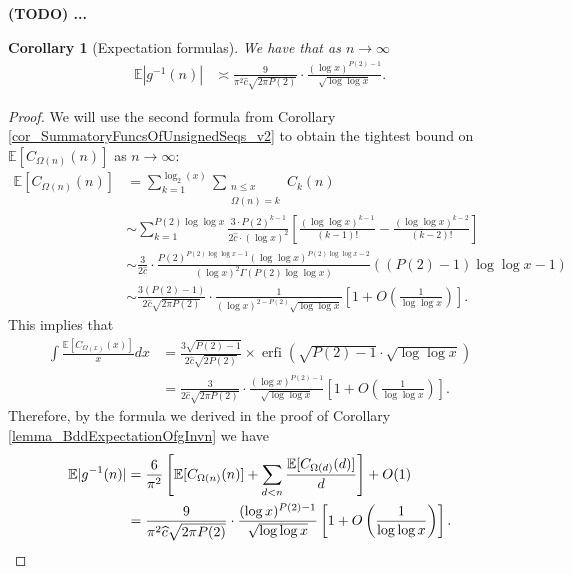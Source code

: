 \documentclass[11pt,reqno,a4letter]{article}
\numberwithin{figure}{section}
\numberwithin{table}{section}
\theoremstyle{plain}
\newtheorem{cor}[theorem]{Corollary}
\numberwithin{theorem}{section}
\theoremstyle{definition}
\begin{document}
\textbf{(TODO) ... } 

\begin{cor}[Expectation formulas] 
We have that as $n \rightarrow \infty$ 
\begin{align*} 
\mathbb{E}|g^{-1}(n)| & \asymp \frac{9}{\pi^2 \widehat{c} \sqrt{2\pi P(2)}} \cdot 
     \frac{(\log x)^{P(2)-1}}{\sqrt{\log\log x}}. 
\end{align*} 
\end{cor} 
\begin{proof} 
We will use the second formula from Corollary \ref{cor_SummatoryFuncsOfUnsignedSeqs_v2} 
to obtain the tightest bound on $\mathbb{E}[C_{\Omega(n)}(n)]$ as $n \rightarrow \infty$: 
\begin{align*} 
\mathbb{E}[C_{\Omega(n)}(n)] & = 
     \sum_{k=1}^{\log_2(x)} \sum_{\substack{n \leq x \\ \Omega(n) = k}} C_k(n) \\ 
     & \sim \sum_{k=1}^{P(2) \log\log x} \frac{3 \cdot P(2)^{k-1}}{ 
     2\widehat{c} \cdot (\log x)^2} \left[\frac{(\log\log x)^{k-1}}{(k-1)!} - 
     \frac{(\log\log x)^{k-2}}{(k-2)!}\right] \\ 
     & \sim \frac{3}{2\widehat{c}} \cdot 
     \frac{P(2)^{P(2)\log\log x-1} (\log\log x)^{P(2)\log\log x-2}}{ 
     (\log x)^2 \Gamma(P(2) \log\log x)} \left((P(2)-1) \log\log x - 1\right) \\ 
     & \sim \frac{3 (P(2)-1)}{2\widehat{c} \sqrt{2\pi P(2)}} \cdot 
     \frac{1}{(\log x)^{2-P(2)} \sqrt{\log\log x}} \left[1 + 
     O\left(\frac{1}{\log\log x}\right)\right]. 
\end{align*} 
This implies that 
\begin{align*} 
\int \frac{\mathbb{E}[C_{\Omega(x)}(x)]}{x} dx & = 
     \frac{3 \sqrt{P(2)-1}}{2\widehat{c} \sqrt{2 P(2)}} \times 
     \operatorname{erfi}\left(\sqrt{P(2)-1} \cdot \sqrt{\log\log x}\right) \\ 
     & = \frac{3}{2\widehat{c} \sqrt{2\pi P(2)}} \cdot 
     \frac{(\log x)^{P(2)-1}}{\sqrt{\log\log x}} \left[1 + 
     O\left(\frac{1}{\log\log x}\right)\right]. 
\end{align*} 
Therefore, by the formula we derived in the proof of 
Corollary \ref{lemma_BddExpectationOfgInvn} we have 
\begin{align*} 
\mathbb{E}|g^{-1}(n)| & = \frac{6}{\pi^2}\left[\mathbb{E}[C_{\Omega(n)}(n)] + 
     \sum_{d<n} \frac{\mathbb{E}[C_{\Omega(d)}(d)]}{d}\right] + O(1) \\ 
     & = \frac{9}{\pi^2 \widehat{c} \sqrt{2\pi P(2)}} \cdot 
     \frac{(\log x)^{P(2)-1}}{\sqrt{\log\log x}} \left[1 + 
     O\left(\frac{1}{\log\log x}\right)\right]. 
     \qedhere 
\end{align*} 
\end{proof} 
\end{document}
